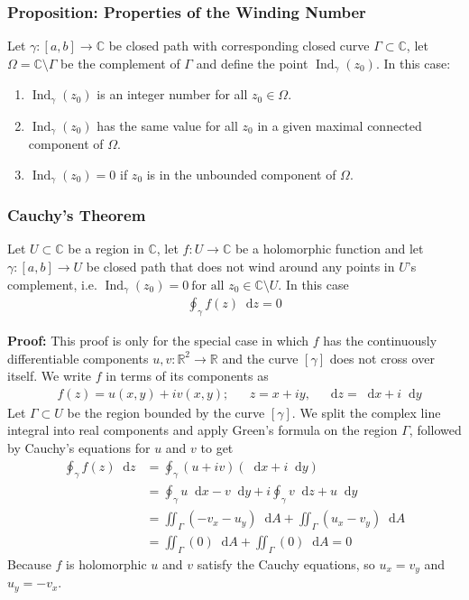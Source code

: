 \documentclass[11pt, a4paper]{article}
\newcommand{\diff}{\mathop{}\!\mathrm{d}} %
\newcommand{\R}{\mathbb{R}} %
\newcommand{\C}{\mathbb{C}} %
\begin{document}
\subsubsection{Proposition: Properties of the Winding Number}
Let $ \gamma : [a, b] \to \C $ be closed path with corresponding closed curve $ \Gamma \subset \C $, let $ \Omega = \C \setminus \Gamma $ be the complement of $ \Gamma $ and define the point $ 	\operatorname{Ind}_{\gamma}(z_0) $. In this case:
\begin{enumerate}
	\item $ \displaystyle{	\operatorname{Ind}_{\gamma}(z_0)} $ is an integer number for all $ z_0 \in \Omega $.
	
	\item $ \displaystyle{	\operatorname{Ind}_{\gamma}(z_0)} $ has the same value for all $ z_0 $ in a given maximal connected component of $ \Omega $.
	
	\item $ \displaystyle{	\operatorname{Ind}_{\gamma}(z_0)} = 0$ if $ z_0 $ is in the unbounded component of $ \Omega $.
\end{enumerate}

\subsubsection{Cauchy's Theorem}
Let $ U \subset \C $ be a region in $ \C $, let $ f: U \to \C $ be a holomorphic function and let $ \gamma : [a, b] \to U $ be closed path that does not wind around any points in $ U $'s complement, i.e. $ 	\operatorname{Ind}_{\gamma}(z_0) = 0 \ \text{for all } z_0 \in \C \setminus U $. In this case
\begin{align*}
	\oint_{\gamma} f(z) \diff z = 0
\end{align*}

\textbf{Proof:} This proof is only for the special case in which $ f $ has the continuously differentiable components $ u, v: \R^2 \to \R $ and the curve $ [\gamma] $ does not cross over itself. We write $ f $ in terms of its components as
\begin{align*}
	&f(z) = u(x, y) + iv(x, y); && z = x + iy, \quad \diff z = \diff x + i \diff y
\end{align*}
Let $ \Gamma \subset U $ be the region bounded by the curve $ [\gamma] $. We split the complex line integral into real components and apply Green's formula on the region $ \Gamma $, followed by Cauchy's equations for $ u $ and $ v $ to get
\begin{align*}
	\oint_{\gamma} f(z) \diff z &= \oint_{\gamma}(u + iv)(\diff x + i \diff y)\\
	&= \oint_{\gamma} u \diff x - v \diff y + i\oint_{\gamma} v \diff z + u \diff y\\
	&=\iint_{\Gamma} (-v_x - u_y) \diff A + \iint_{\Gamma} (u_x - v_y) \diff A\\
	&=\iint_{\Gamma} (0) \diff A + \iint_{\Gamma} (0) \diff A = 0
\end{align*}
Because $ f $ is holomorphic $ u $ and $ v $ satisfy the Cauchy equations, so $ u_x = v_y $ and $ u_y = -v_x $. 
\end{document}

